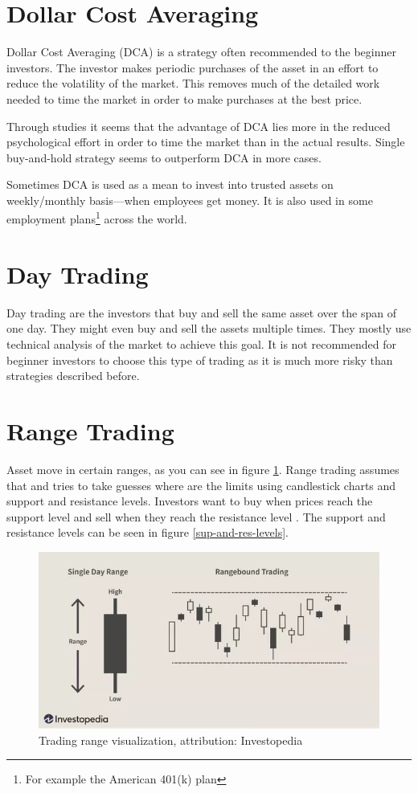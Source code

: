 \section{Dollar Cost Averaging}
Dollar Cost Averaging (DCA) is a strategy often recommended to the beginner investors. The investor makes periodic purchases of the asset in an effort to reduce the volatility of the market. This removes much of the detailed work needed to time the market in order to make purchases at the best price.

Through studies \cite{DCA-study} it seems that the advantage of DCA lies more in the reduced psychological effort in order to time the market than in the actual results. Single buy-and-hold strategy seems to outperform DCA in more cases.

Sometimes DCA is used as a mean to invest into trusted assets on weekly/monthly basis---when employees get money. It is also used in some employment plans\footnote{For example the American 401(k) plan} across the world.

\section{Day Trading}
Day trading are the investors that buy and sell the same asset over the span of one day. They might even buy and sell the assets multiple times. They mostly use technical analysis of the market to achieve this goal. It is not recommended for beginner investors to choose this type of trading as it is much more risky than strategies described before.

\section{Range Trading}
Asset move in certain ranges, as you can see in figure \ref{trading-range-figure}. Range trading assumes that and tries to take guesses where are the limits using candlestick charts and support and resistance levels. Investors want to buy when prices reach the support level and sell when they reach the resistance level \cite{5types-of-daytrading}. The support and resistance levels can be seen in figure \ref{sup-and-res-levels}.

\begin{figure}[ht]
    \centering
    \includegraphics[width=\columnwidth]{figures/trading-range.png}
    \caption{Trading range visualization, attribution: Investopedia \cite{investopedia:trading-range}}
    \label{trading-range-figure}
\end{figure}

